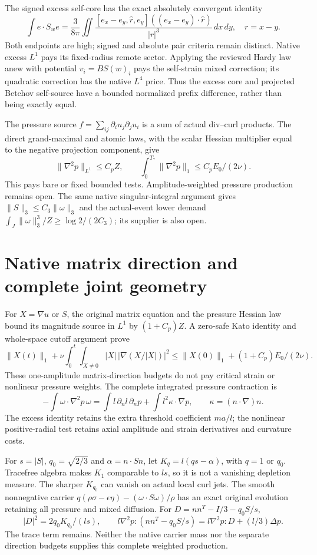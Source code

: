 \documentclass[11pt]{article}
\begin{document}
The signed excess self-core has the exact absolutely convergent identity
\[
 \int e\cdot S_we=\frac3{8\pi}\iint
 \frac{[e_x-e_y,\hat r,e_y]((e_x-e_y)\cdot\hat r)}{|r|^3}\,dx\,dy,
 \quad r=x-y.
\]
Both endpoints are high; signed and absolute pair criteria remain distinct.
Native excess $L^1$ pays its fixed-radius remote sector. Applying the
reviewed Hardy law anew with potential $v_i=BS(w)_i$ pays the self-strain
mixed correction; its quadratic correction has the native $L^4$ price.
Thus the excess core and projected Betchov self-source have a bounded
normalized prefix difference, rather than being exactly equal.

The pressure source $f=\sum_{ij}\partial_i u_j\partial_j u_i$ is a sum
of actual div--curl products. The direct grand-maximal and atomic laws,
with the scalar Hessian multiplier equal to the negative projection
component, give
\[
 \|\nabla^2p\|_{L^1}\le C_pZ,
 \qquad\int_0^{T_*}\|\nabla^2p\|_1\le C_pE_0/(2\nu).
\]
This pays bare or fixed bounded tests. Amplitude-weighted pressure
production remains open. The same native singular-integral argument gives
$\|S\|_3\le C_3\|\omega\|_3$ and the actual-event lower demand
$\int_J\|\omega\|_3^3/Z\ge\log2/(2C_3)$; its supplier is also open.

\section{Native matrix direction and complete joint geometry}
For $X=\nabla u$ or $S$, the original matrix equation and the pressure
Hessian law bound its magnitude source in $L^1$ by $(1+C_p)Z$.
A zero-safe Kato identity and whole-space cutoff argument prove
\[
 \|X(t)\|_1+\nu\int_0^t\!\int_{X\ne0}
 |X|\,|\nabla(X/|X|)|^2
 \le\|X(0)\|_1+(1+C_p)E_0/(2\nu).
\]
These one-amplitude matrix-direction budgets do not pay critical strain
or nonlinear pressure weights.
The complete integrated pressure contraction is
\[
 -\int\omega\cdot\nabla^2p\,\omega
 =\int l\,\partial_n l\,\partial_n p+\int l^2\kappa\cdot\nabla p,
 \qquad\kappa=(n\cdot\nabla)n.
\]
The excess identity retains the extra threshold coefficient $ma/l$;
the nonlinear positive-radial test retains axial amplitude and strain
derivatives and curvature costs.

For $s=|S|$, $q_0=\sqrt{2/3}$ and $\alpha=n\cdot Sn$, let
$K_q=l(qs-\alpha)$, with $q=1$ or $q_0$.
Tracefree algebra makes $K_1$ comparable to $ls$, so it is not a
vanishing depletion measure. The sharper $K_{q_0}$ can vanish on actual
local curl jets. The smooth nonnegative carrier
$q(\rho\sigma-\epsilon\eta)-(\omega\cdot S\omega)/\rho$
has an exact original evolution retaining all pressure and mixed diffusion.
For $D=nn^T-I/3-q_0S/s$,
\[
 |D|^2=2q_0K_{q_0}/(ls),\qquad
 l\nabla^2p:(nn^T-q_0S/s)=l\nabla^2p:D+(l/3)\Delta p.
\]
The trace term remains. Neither the native carrier mass nor the separate
direction budgets supplies this complete weighted production.
\end{document}
